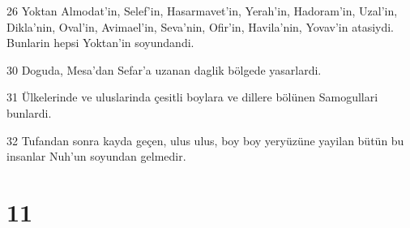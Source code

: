 \par 26 Yoktan Almodat'in, Selef'in, Hasarmavet'in, Yerah'in, Hadoram'in, Uzal'in, Dikla'nin, Oval'in, Avimael'in, Seva'nin, Ofir'in, Havila'nin, Yovav'in atasiydi. Bunlarin hepsi Yoktan'in soyundandi.
\par 30 Doguda, Mesa'dan Sefar'a uzanan daglik bölgede yasarlardi.
\par 31 Ülkelerinde ve uluslarinda çesitli boylara ve dillere bölünen Samogullari bunlardi.
\par 32 Tufandan sonra kayda geçen, ulus ulus, boy boy yeryüzüne yayilan bütün bu insanlar Nuh'un soyundan gelmedir.

\chapter{11}


